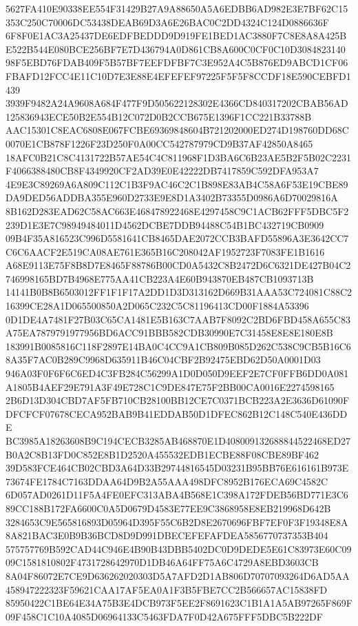 \documentclass[UTF8,fontset=fandol,zihao=-4,a4paper]{ctexart}
\begin{document}
{{5627FA410E90338EE554F31429B27A9A88650A5A6EDBB6AD982E3E7BF62C15353C250C70006DC53438DEAB69D3A6E26BAC0C2DD4324C124D0886636F
6F8F0E1AC3A25437DE6EDFBEDDD9D919FE1BED1AC3880F7C8E8A8A425BE522B544E080BCE256BF7E7D436794A0D861CB8A600C0CF0C10D3084823140
98F5EBD76FDAB409F5B57BF7EEFDFBF7C3E952A4C5B876ED9ABCD1CF06FBAFD12FCC4E11C10D7E3E88E4EFEFEF97225F5F5F8CCDF18E590CEBFD1439
3939F9482A24A9608A684F477F9D505622128302E4366CD840317202CBAB56AD125836943ECE50B2E554B12C072D0B2CCB675E1396F1CC221B33788B
AAC15301C8EAC6808E067FCBE69369848604B721202000ED274D198760DD68C0070E1CB878F1226F23D250F0A00CC542787979CD9B37AF42850A8465
18AFC0B21C8C4131722B57AE54C4C811968F1D3BA6C6B23AE5B2F5B02C2231F4066388480CB8F4349920CF2AD39E0E42222DB7417859C592DFA953A7
4E9E3C89269A6A809C112C1B3F9AC46C2C1B898E83AB4C58A6F53E19CBE89DA9DED56ADDBA355E960D2733E9E8D1A3402B73355D0986A6D70029816A
8B162D283EAD62C58AC663E468478922468E4297458C9C1ACB62FFF5DBC5F2239D1E3E7C98949484011D4562DCBE7DDB94488C54B1BC432719CB0909
09B4F35A816523C996D5581641CB8465DAE2072CCB3BAFD55896A3E3642CC7C6C6AACF2E519CA08AE761E365B16C208042AF1952723F7083FE1B1616
A68E9113E75F8B8D7E8465F88786B00CD0A5432C8B2472D6C6321DE427B04C2746998165BD7B4968E775AA41CB223A4E60B943870EB487CB1093713B
14141B0B8B6503012FF1F1F17A2DD1D3D313162D669B31AAA53C724081C88C216399CE28A1D065500850A2D065C232C5C81196413CD00F1884A53396
0D1DE4A7481F27B03C65CA1481E5B163C7AAB7F8092C2BD6FBD458A655C83A75EA7879791977956BD6ACC91BBB582CDB30990E7C31458E8E8E180E8B
183991B0085816C118F2897E14BA0C4CC9A1CB809B085D262C538C9CB5B16C68A35F7AC0B289C9968D635911B46C04CBF2B92475EBD62D50A0001D03
946A03F0F6F6C6ED4C3FB284C56299A1D0D050D9EEF2E7CF0FFB6DD0A081A1805B4AEF29E791A3F49E728C1C9DE847E75F2BB00CA0016E2274598165
2B6D13D304CBD7AF5FB710CB28100BB12CE7C0371BCB223A2E3636D61090FDFCFCF07678CECA952BAB9B41EDDAB50D1DFEC862B12C148C540E436DDE
BC3985A18263608B9C194CECB3285AB468870E1D408009132688844522468ED27B0A2C8B13FD0C852E8B1D2520A455532EDB1ECBE88F08CBE89BF462
39D583FCE464CB02CBD3A64D33B29744816545D03231B95BB76E616161B973E73674FE1784C7163DDAA64D9B2A55AAA498DFC8952B176ECA69C4582C
6D057AD0261D11F5A4FE0EFC313ABA4B568E1C398A172FDEB56BD771E3C689CC188B172FA6600C0A5D0679D4583E77EE9C3868958E8EB219968D642B
3284653C9E565816893D05964D395F55C6B2D8E2670696FBF7EF0F3F19348E8A8A821BAC3E0B9B36BCD8D9D991DBECEFEFAFDEA5856770737353B404
575757769B592CAD44C946E4B90B43DBB5402DC0D9DEDE5E61C83973E60C0909C1581810802F4731728642970D1DB46A64FF75A6C4729A8EBD3603CB
8A04F86072E7CE9D636262020303D5A7AFD2D1AB806D70707093264D6AD5AA458947222323F59621CAA17AF5EA0A1F3B5FBE7CC2B566657AC15838FD
85950422C1BE64E34A75B3E4DCB973F5EE2F8691623C1B1A1A5AB97265F869F09F458C1C10A4085D06964133C5463FDA7F0D42A675FFF5DBC5B222DF
}}
\end{document}
